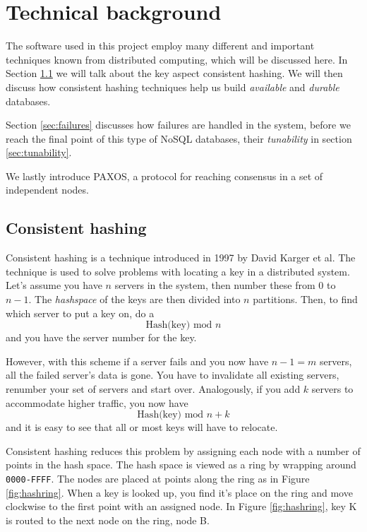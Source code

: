 
\section{Technical background}
\label{sec:technical_background}

The software used in this project employ many different and important techniques known from distributed computing, which will be discussed here.
In Section \ref{sec:consistenthashing} we will talk about the key aspect consistent hashing.
We will then discuss how consistent hashing techniques help us build \emph{available} and \emph{durable} databases.

Section \ref{sec:failures} discusses how failures are handled in the system, before we reach the final point of this type of NoSQL databases, their \emph{tunability} in section \ref{sec:tunability}.

We lastly introduce PAXOS, a protocol for reaching consensus in a set of independent nodes.

\subsection{Consistent hashing}
\label{sec:consistenthashing}
Consistent hashing is a technique introduced in 1997 by David Karger\cite{Karger97consistenthashing} et al.
The technique is used to solve problems with locating a key in a distributed system.
Let's assume you have $n$ servers in the system, then number these from $0$ to $n-1$.
The \emph{hashspace} of the keys are then divided into $n$ partitions. Then, to find which server to put a key on, do a $$\textrm{Hash(key) mod } n$$ and you have the server number for the key. 

However, with this scheme if a server fails and you now have $n-1=m$ servers, all the failed server's data is gone.
You have to invalidate all existing servers, renumber your set of servers and start over.
Analogously, if you add $k$ servers to accommodate higher traffic, you now have $$\textrm{Hash(key) mod } n + k$$ and it is easy to see that all or most keys will have to relocate.

Consistent hashing reduces this problem by assigning each node with a number of points in the hash space.
The hash space is viewed as a ring by wrapping around \texttt{0000-FFFF}. The nodes are placed at points along the ring as in Figure \ref{fig:hashring}. When a key is looked up, you find it's place on the ring and move clockwise to the first point with an assigned node. In Figure \ref{fig:hashring}, key K is routed to the next node on the ring, node B.

